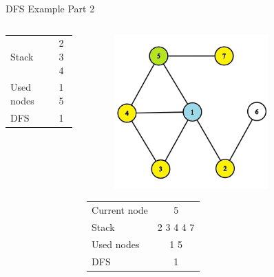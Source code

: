 \documentclass[aspectratio=169]{beamer}%
\begin{document}
\begin{frame}{DFS Example Part 2}
\begin{columns}
\begin{column}{0.32\textwidth}
\begin{table}[ht]
\begin{tabular}{l c}
                    Stack & 2 3 4\\ 
                    Used nodes & 1 5\\
                    DFS & 1
                \end{tabular}
            \end{table}
        \end{column}
        \hfill
        \begin{column}{0.32\textwidth}
            \begin{figure}[!ht]
                \centering
                \includegraphics[width=0.9\linewidth]{dfs 5.png}
            \end{figure}
            \begin{table}[ht]
                \centering
                \begin{tabular}{l c}
                    Current node & 5\\
                    Stack & 2 3 4 4 7 \\ 
                    Used nodes & 1 5\\
                    DFS & 1
                \end{tabular}
            \end{table}
        \end{column}
        \hfill
        \begin{column}{0.32\textwidth}
            \begin{figure}[!ht]

\end{figure}
\end{column}
\end{columns}
\end{frame}
\end{document}
